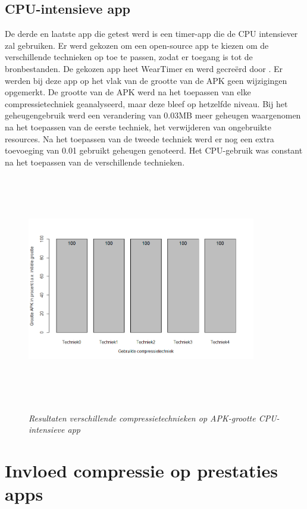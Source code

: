 \subsection{CPU-intensieve app}
\vspace{-15px}
De derde en laatste app die getest werd is een timer-app die de CPU intensiever zal gebruiken. Er werd gekozen om een open-source app te kiezen om de verschillende technieken op toe te passen, zodat er toegang is tot de bronbestanden. De gekozen app heet WearTimer en werd gecreërd door \autocite{weartimer}.
Er werden bij deze app op het vlak van de grootte van de APK geen wijzigingen opgemerkt. De grootte van de APK werd na het toepassen van elke compressietechniek geanalyseerd, maar deze bleef op hetzelfde niveau. Bij het geheugengebruik werd een verandering van 0.03MB meer geheugen waargenomen na het toepassen van de eerste techniek, het verwijderen van ongebruikte resources. Na het toepassen van de tweede techniek werd er nog een extra toevoeging van 0.01 gebruikt geheugen genoteerd. Het CPU-gebruik was constant na het toepassen van de verschillende technieken.
\begin{figure}[H]
	\centering
	\caption{\textit{Resultaten verschillende compressietechnieken op APK-grootte CPU-intensieve app}}
	\includegraphics[width=10cm, height=10cm, keepaspectratio]{img/Rplot02}\\[.5cm]
	
\end{figure}

\section{Invloed compressie op prestaties apps}
\label{sec:invloedcompressie}
